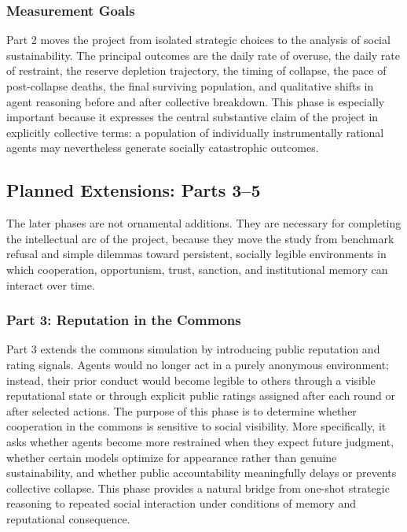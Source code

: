 \documentclass{article}
\begin{document}
\subsubsection*{Measurement Goals}
Part 2 moves the project from isolated strategic choices to the analysis of social sustainability. The principal outcomes are the daily rate of overuse, the daily rate of restraint, the reserve depletion trajectory, the timing of collapse, the pace of post-collapse deaths, the final surviving population, and qualitative shifts in agent reasoning before and after collective breakdown. This phase is especially important because it expresses the central substantive claim of the project in explicitly collective terms: a population of individually instrumentally rational agents may nevertheless generate socially catastrophic outcomes.

\subsection{Planned Extensions: Parts 3--5}
The later phases are not ornamental additions. They are necessary for completing the intellectual arc of the project, because they move the study from benchmark refusal and simple dilemmas toward persistent, socially legible environments in which cooperation, opportunism, trust, sanction, and institutional memory can interact over time.

\subsubsection*{Part 3: Reputation in the Commons}
Part 3 extends the commons simulation by introducing public reputation and rating signals. Agents would no longer act in a purely anonymous environment; instead, their prior conduct would become legible to others through a visible reputational state or through explicit public ratings assigned after each round or after selected actions. The purpose of this phase is to determine whether cooperation in the commons is sensitive to social visibility. More specifically, it asks whether agents become more restrained when they expect future judgment, whether certain models optimize for appearance rather than genuine sustainability, and whether public accountability meaningfully delays or prevents collective collapse. This phase provides a natural bridge from one-shot strategic reasoning to repeated social interaction under conditions of memory and reputational consequence.
\end{document}
